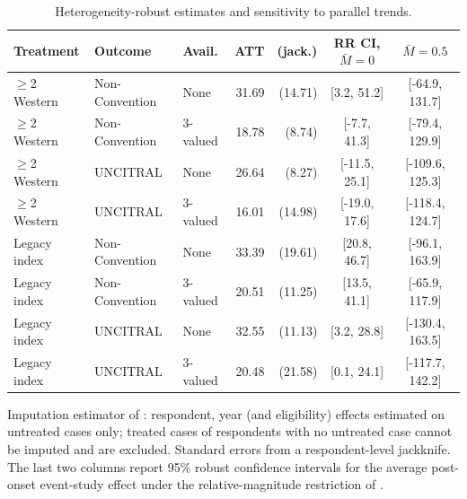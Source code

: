 \begin{table}[t]
\centering
\caption{Heterogeneity-robust estimates and sensitivity to parallel trends.}
\label{tab:event}
\small
\setlength{\tabcolsep}{4pt}
\begin{tabular}{lllrrcc}
\toprule
Treatment & Outcome & Avail. & ATT & (jack.) & RR CI, $\bar M=0$ & $\bar M=0.5$ \\
\midrule
$\geq$2 Western & Non-Convention & None & 31.69 & (14.71) & [3.2, 51.2] & [-64.9, 131.7] \\
$\geq$2 Western & Non-Convention & 3-valued & 18.78 & (8.74) & [-7.7, 41.3] & [-79.4, 129.9] \\
$\geq$2 Western & UNCITRAL & None & 26.64 & (8.27) & [-11.5, 25.1] & [-109.6, 125.3] \\
$\geq$2 Western & UNCITRAL & 3-valued & 16.01 & (14.98) & [-19.0, 17.6] & [-118.4, 124.7] \\
Legacy index & Non-Convention & None & 33.39 & (19.61) & [20.8, 46.7] & [-96.1, 163.9] \\
Legacy index & Non-Convention & 3-valued & 20.51 & (11.25) & [13.5, 41.1] & [-65.9, 117.9] \\
Legacy index & UNCITRAL & None & 32.55 & (11.13) & [3.2, 28.8] & [-130.4, 163.5] \\
Legacy index & UNCITRAL & 3-valued & 20.48 & (21.58) & [0.1, 24.1] & [-117.7, 142.2] \\
\bottomrule
\end{tabular}
\par\medskip
\begin{minipage}{0.95\linewidth}\footnotesize
Imputation estimator of \citet{borusyak2024}: respondent, year (and eligibility) effects estimated on untreated cases only; treated cases of respondents with no untreated case cannot be imputed and are excluded. Standard errors from a respondent-level jackknife. The last two columns report 95\% robust confidence intervals for the average post-onset event-study effect under the relative-magnitude restriction of \citet{rambachan2023}.
\end{minipage}
\end{table}
